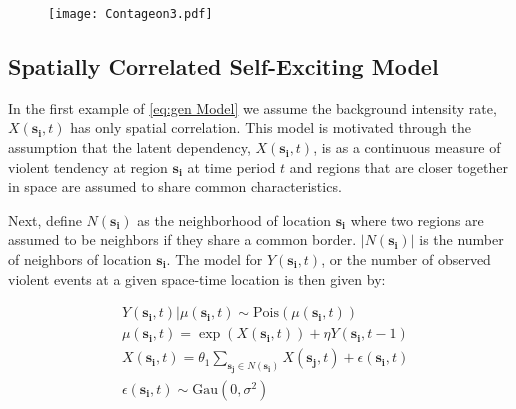 \documentclass[11pt]{isuthesis}
\begin{document}
\begin{figure}[h]
	\begin{center} %
		\vspace{6pc}
		\texttt{[image: Contageon3.pdf]}
		\label{exc} 
	\end{center}
\end{figure}



\subsection{Spatially Correlated Self-Exciting Model}

In the first example of \eqref{eq:gen Model} we assume the background intensity rate, $X(\boldsymbol{s_i},t)$ has only spatial correlation.  This model is motivated through the assumption that the latent dependency, $X(\boldsymbol{s_i},t)$, is as a continuous measure of violent tendency at region $\boldsymbol{s_i}$ at time period $t$ and regions that are closer together in space are assumed to share common characteristics.  

Next, define $N(\boldsymbol{s_i})$ as the neighborhood of location $\boldsymbol{s_i}$ where two regions are assumed to be neighbors if they share a common border.   $|N(\boldsymbol{s_i})|$ is the number of neighbors of location $\boldsymbol{s_i}$.  The model for $Y(\boldsymbol{s_i},t)$, or the number of observed violent events at a given space-time location is then given by:

\begin{align}
& Y(\boldsymbol{s_i},t)|\mu(\boldsymbol{s_i},t) \sim \mbox{Pois}(\mu(\boldsymbol{s_i},t)) \label{eq:Full Model}\\
& \mu(\boldsymbol{s_i},t) = \exp(X(\boldsymbol{s_i},t)) + \eta Y(\boldsymbol{s_i},t-1) \nonumber \\
& X(\boldsymbol{s_i},t) = \theta_1 \sum_{\boldsymbol{s_j}\in N(\boldsymbol{s_i})}X(\boldsymbol{s_j},t) + \epsilon(\boldsymbol{s_i},t) \nonumber\\
&\epsilon(\boldsymbol{s_i},t) \sim \mbox{Gau}(0,\sigma^2) \nonumber
\end{align}
\end{document}

